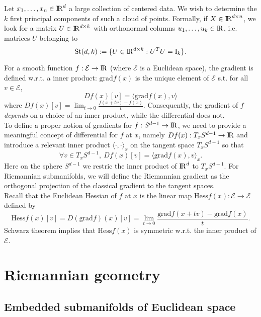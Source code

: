 \documentclass[10pt,a4paper]{book}
\theoremstyle{definition}
\theoremstyle{plain}
\theoremstyle{remark}
\newcommand{\grad}{\textrm{grad}}
\newcommand \Hess {\text{Hess}}
\def\R{{\rm I\kern-0.16em R}}
\begin{document}
\par \medskip
Let $x_1,\dots, x_n\in \R^d$ a large collection of centered data. We wish to determine the $k$ first principal components of such a cloud of points. Formally, if $X\in \R^{d\times n}$, we look for a matrix $U\in \R^{d\times k}$ with orthonormal columns $u_1,\dots, u_k \in \R$, i.e. matrices $U$ belonging to
$$\text{St}(d,k):=\{U\in \R^{d\times k}: U^{T}U=\text{I}_k\}.$$
\par\medskip
For a smooth function $f:\mathcal{E} \to \R$ (where $\mathcal{E}$ is a Euclidean space), the gradient is defined w.r.t. a inner product: $\grad f(x)$ is the unique element of $\mathcal{E}$ s.t. for all $v\in \mathcal{E}$,
$$Df(x)[v]=\langle \grad f(x),v\rangle$$
where $Df(x)[v]=\lim_{t\to 0}\frac{f(x+tv)-f(x)}{t}$. Consequently, the gradient of $f$ \emph{depends} on a choice of an inner product, while the differential does not. \\ To define a proper notion of gradients for $f:S^{d-1}\to \R$, we need to provide a meaningful concept of differential for $f$ at $x$, namely $Df(x):T_xS^{d-1}\to \R$ and introduce a relevant inner product $\langle \cdot,\cdot \rangle_x$ on the tangent space $T_xS^{d-1}$ so that
$$\forall v\in T_xS^{d-1},~Df(x)[v]=\langle \grad f(x),v\rangle_x.$$
Here on the sphere $S^{d-1}$ we restric the inner product of $\R^d$ to $T_xS^{d-1}$. For Riemannian submanifolds, we will define the Riemannian gradient as the orthogonal projection of the classical gradient to the tangent spaces.
\\ Recall that the Euclidean Hessian of $f$ at $x$ is the linear map $\Hess f(x):\mathcal{E}\to \mathcal{E}$ defined by
$$\Hess f(x)[v]=D(\grad f)(x)[v]=\lim_{t\to 0}\frac{\grad f(x+tv)-\grad f(x)}{t}.$$
Schwarz theorem implies that $\Hess f(x)$ is symmetric w.r.t. the inner product of $\mathcal{E}$.

\chapter{Riemannian geometry}
\section{Embedded submanifolds of Euclidean space}
\end{document}
